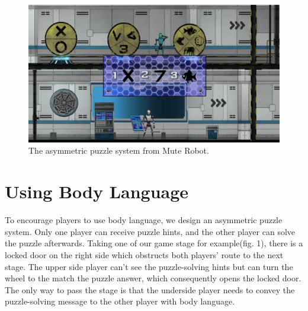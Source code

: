\documentclass{chi-ext}
\begin{document}

\begin{figure}
  \centering
  \includegraphics[width=\linewidth]{figures/Figure1.jpg}
  \caption{The asymmetric puzzle system from Mute Robot.}
  \label{fig:Figure1}
\end{figure}


\section{Using Body Language}

To encourage players to use body language, we design an asymmetric puzzle system. Only one player can receive puzzle hints, and the other player can solve the puzzle afterwards.
Taking one of our game stage for example(fig. 1), there is a locked door on the right side which obstructs both players' route to the next stage. 
The upper side player can't see the puzzle-solving hints but can turn the wheel to the match the puzzle answer, which consequently opens the locked door.
The only way to pass the stage is that the underside player needs to convey the puzzle-solving message to the other player with body language. 

\end{document}
